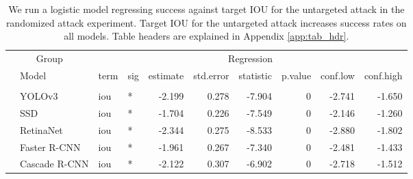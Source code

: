 \begingroup\fontsize{9}{11}\selectfont

\begin{longtable}[t]{llllrrrrrr}
\caption{\label{tab:untarget_iou_table}We run a logistic model regressing success against target IOU for the untargeted attack in the randomized attack experiment. Target IOU for the untargeted attack increases success rates on all models. Table headers are explained in Appendix \ref{app:tab_hdr}.}\\
\toprule
\multicolumn{2}{c}{Group} & \multicolumn{8}{c}{Regression} \\
\cmidrule(l{3pt}r{3pt}){1-2} \cmidrule(l{3pt}r{3pt}){3-10}
 & Model & term & sig & estimate & std.error & statistic & p.value & conf.low & conf.high\\
\midrule
\addlinespace[0.3em]
\multicolumn{10}{l}{\textbf{Untargeted}}\\
\hspace{1em} & YOLOv3 & iou & * & -2.199 & 0.278 & -7.904 & 0 & -2.741 & -1.650\\
\cmidrule{2-10}\nopagebreak
\hspace{1em} & SSD & iou & * & -1.704 & 0.226 & -7.549 & 0 & -2.146 & -1.260\\
\cmidrule{2-10}\nopagebreak
\hspace{1em} & RetinaNet & iou & * & -2.344 & 0.275 & -8.533 & 0 & -2.880 & -1.802\\
\cmidrule{2-10}\nopagebreak
\hspace{1em} & Faster R-CNN & iou & * & -1.961 & 0.267 & -7.340 & 0 & -2.481 & -1.433\\
\cmidrule{2-10}\nopagebreak
\hspace{1em} & Cascade R-CNN & iou & * & -2.122 & 0.307 & -6.902 & 0 & -2.718 & -1.512\\
\bottomrule
\end{longtable}
\endgroup{}
